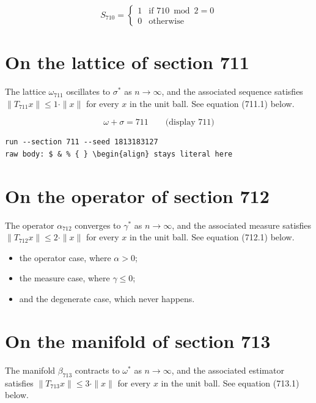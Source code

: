 \documentclass{article}
\begin{document}
\begin{equation}
S_{710} = \begin{cases} 1 & \text{if } 710 \bmod 2 = 0 \\ 0 & \text{otherwise} \end{cases}
\end{equation}

\section{On the lattice of section 711}
The lattice $\omega_{711}$ oscillates to $\sigma^{*}$ as $n \to \infty$,
and the associated sequence satisfies $\|T_{711} x\| \leq 1 \cdot \|x\|$
for every $x$ in the unit ball. See equation (711.1) below.

$$
\omega + \sigma = 711 \qquad \text{(display 711)}
$$

\begin{verbatim}
run --section 711 --seed 1813183127
raw body: $ & % { } \begin{align} stays literal here
\end{verbatim}

\section{On the operator of section 712}
The operator $\alpha_{712}$ converges to $\gamma^{*}$ as $n \to \infty$,
and the associated measure satisfies $\|T_{712} x\| \leq 2 \cdot \|x\|$
for every $x$ in the unit ball. See equation (712.1) below.

\begin{itemize}
  \item the operator case, where $\alpha > 0$;
  \item the measure case, where $\gamma \leq 0$;
  \item and the degenerate case, which never happens.
\end{itemize}

\section{On the manifold of section 713}
The manifold $\beta_{713}$ contracts to $\omega^{*}$ as $n \to \infty$,
and the associated estimator satisfies $\|T_{713} x\| \leq 3 \cdot \|x\|$
for every $x$ in the unit ball. See equation (713.1) below.
\end{document}
